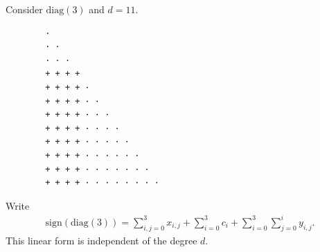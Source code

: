\begin{example}
    Consider \( \mathrm{diag}(3) \) and \( d = 11 \).
    \begin{verbatim}
        · 
        · · 
        · · · 
        + + + + 
        + + + + · 
        + + + + · · 
        + + + + · · · 
        + + + + · · · · 
        + + + + · · · · · 
        + + + + · · · · · · 
        + + + + · · · · · · · 
        + + + + · · · · · · · ·
    \end{verbatim}
    Write 
    \begin{align*}
        \mathrm{sign}(\mathrm{diag}(3)) = \sum_{i,j=0}^3 x_{i,j} + \sum_{i=0}^3 c_i + \sum_{i=0}^3 \sum^{i}_{j=0} y_{i,j}.
    \end{align*}
    This linear form is independent of the degree \( d \).
\end{example}